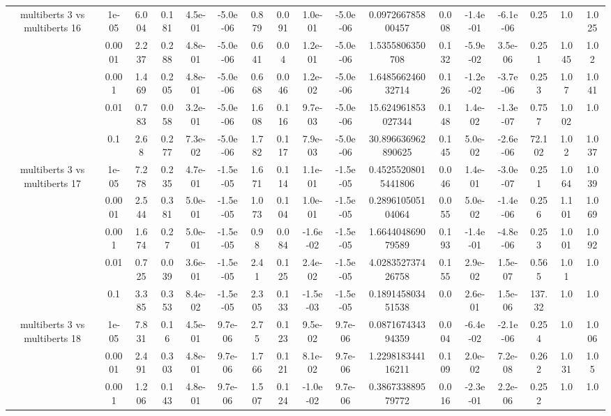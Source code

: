 \begin{tabular}{|c|c|c|c|c|c|c|c|c|c|c|c|c|c|c|c|c|}
\hline
\multirow{5}{*}{multiberts 3 vs multiberts 16} & 1e-05 & 6.004 & 0.181 & 4.5e-01 & -5.0e-06 & 0.879 & 0.091 & 1.0e-01 & -5.0e-06 & 0.097266785800457 & 0.008 & -1.4e-01 & -6.1e-06 & 0.25 & 1.0 & 1.025 \\
 & 0.0001 & 2.237 & 0.288 & 4.8e-01 & -5.0e-06 & 0.641 & 0.04 & 1.2e-01 & -5.0e-06 & 1.5355806350708 & 0.132 & -5.9e-02 & 3.5e-06 & 0.251 & 1.045 & 1.02 \\
 & 0.001 & 1.469 & 0.205 & 4.8e-01 & -5.0e-06 & 0.668 & 0.046 & 1.2e-02 & -5.0e-06 & 1.648566246032714 & 0.126 & -1.2e-02 & -3.7e-06 & 0.253 & 1.07 & 1.041 \\
 & 0.01 & 0.783 & 0.058 & 3.2e-01 & -5.0e-06 & 1.608 & 0.116 & 9.7e-03 & -5.0e-06 & 15.624961853027344 & 0.148 & 1.4e-02 & -1.3e-07 & 0.757 & 1.002 & 1.0 \\
 & 0.1 & 2.68 & 0.277 & 7.3e-02 & -5.0e-06 & 1.782 & 0.117 & 7.9e-03 & -5.0e-06 & 30.896636962890625 & 0.145 & 5.0e-02 & -2.6e-06 & 72.102 & 1.02 & 1.037 \\
\hline
\multirow{5}{*}{multiberts 3 vs multiberts 17} & 1e-05 & 7.278 & 0.235 & 4.7e-01 & -1.5e-05 & 1.671 & 0.114 & 1.1e-01 & -1.5e-05 & 0.45255208015441806 & 0.046 & 1.4e-01 & -3.0e-07 & 0.251 & 1.064 & 1.039 \\
 & 0.0001 & 2.544 & 0.381 & 5.0e-01 & -1.5e-05 & 1.073 & 0.104 & 1.0e-01 & -1.5e-05 & 0.289610505104064 & 0.055 & 5.0e-02 & -1.4e-06 & 0.256 & 1.101 & 1.069 \\
 & 0.001 & 1.674 & 0.27 & 5.0e-01 & -1.5e-05 & 0.98 & 0.084 & -1.6e-02 & -1.5e-05 & 1.664404869079589 & 0.193 & -1.4e-01 & -4.8e-06 & 0.253 & 1.001 & 1.092 \\
 & 0.01 & 0.725 & 0.039 & 3.6e-01 & -1.5e-05 & 2.41 & 0.125 & 2.4e-02 & -1.5e-05 & 4.028352737426758 & 0.155 & 2.9e-02 & 1.5e-07 & 0.565 & 1.01 & 1.0 \\
 & 0.1 & 3.385 & 0.353 & 8.4e-02 & -1.5e-05 & 2.305 & 0.133 & -1.5e-03 & -1.5e-05 & 0.189145803451538 & 0.0 & 2.6e-01 & 1.5e-06 & 137.32 & 1.0 & 1.0 \\
\hline
\multirow{5}{*}{multiberts 3 vs multiberts 18} & 1e-05 & 7.831 & 0.16 & 4.5e-01 & 9.7e-06 & 2.75 & 0.123 & 9.5e-02 & 9.7e-06 & 0.087167434394359 & 0.004 & -6.4e-02 & -2.1e-06 & 0.254 & 1.0 & 1.006 \\
 & 0.0001 & 2.491 & 0.303 & 4.8e-01 & 9.7e-06 & 1.766 & 0.121 & 8.1e-02 & 9.7e-06 & 1.229818344116211 & 0.109 & 2.0e-02 & 7.2e-08 & 0.262 & 1.031 & 1.05 \\
 & 0.001 & 1.206 & 0.143 & 4.8e-01 & 9.7e-06 & 1.507 & 0.124 & -1.0e-02 & 9.7e-06 & 0.386733889579772 & 0.016 & -2.3e-01 & 2.2e-06 & 0.252 & 1.0 & 1.0 \\

\end{tabular}
